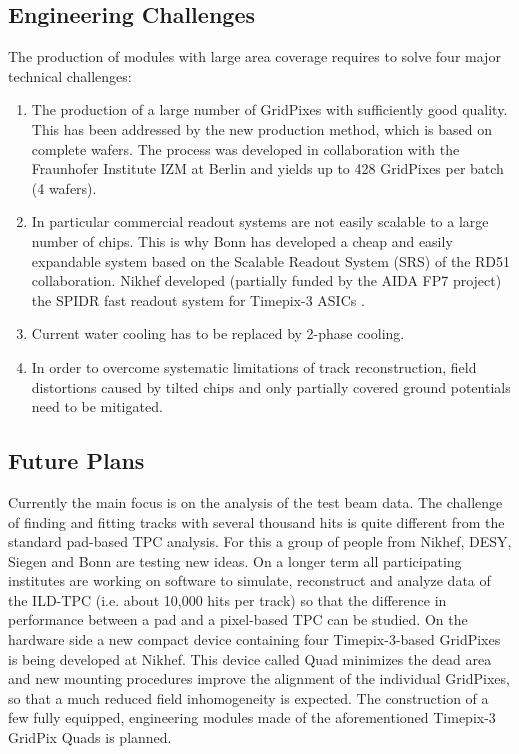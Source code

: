 \subsection{Engineering Challenges}
The production of modules with large area coverage requires to solve four
major technical challenges: 
\begin{enumerate}
  \item The production of a large number of GridPixes with sufficiently good
quality. This has been addressed by the new production method, which is based
on complete wafers. The process was developed in collaboration with the
Fraunhofer Institute IZM at Berlin and yields up to 428 GridPixes per batch (4 wafers). 
\item In particular commercial readout systems are not easily scalable to a large number of chips. This is why Bonn has developed a cheap and easily expandable system based on the Scalable Readout System (SRS) of the RD51 collaboration.
Nikhef developed (partially funded by the AIDA FP7 project) the SPIDR fast readout system for Timepix-3 ASICs \cite{1748-0221-10-12-C12028}.
\item Current water cooling has to be replaced by 2-phase  cooling.
\item In order to overcome systematic limitations of track reconstruction, field
  distortions caused by tilted chips and only partially covered ground
  potentials need to be mitigated.
\end{enumerate}

\subsection{Future Plans}
Currently the main focus is on the analysis of the test beam data. The
challenge of finding and fitting tracks with several thousand hits is quite
different from the standard pad-based TPC analysis. For this a group of people
from Nikhef, DESY, Siegen and Bonn are testing new ideas. On a longer term all
participating institutes are working on software to simulate, reconstruct and
analyze data of the ILD-TPC (i.e. about 10,000 hits per track) so that the
difference in performance between a pad and a pixel-based TPC can be studied. 
On the hardware side a new compact device containing four Timepix-3-based
GridPixes is being developed at Nikhef. This device called Quad minimizes the
dead area and new mounting procedures improve the alignment of the individual GridPixes,
so that a much reduced field inhomogeneity is expected. The construction of a
few fully equipped, engineering modules made of the aforementioned Timepix-3
GridPix Quads is planned.

